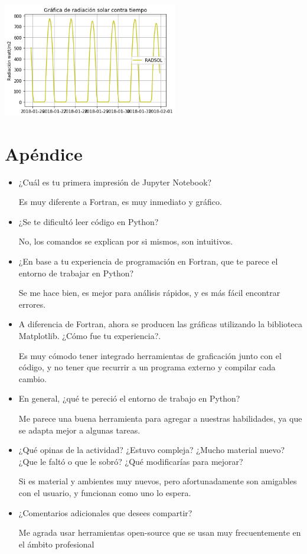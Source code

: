 \documentclass[a4paper]{article}
\begin{document}
\begin{center}
\includegraphics[height=5cm]{grafica6.png}

\end{center}


\section*{Apéndice}


\begin{itemize}
\item     ¿Cuál es tu primera impresión de Jupyter Notebook?

Es muy diferente a Fortran, es muy inmediato y gráfico.

\item     ¿Se te dificultó leer código en Python?

No, los comandos se explican por si mismos, son intuitivos.

\item     ¿En base a tu experiencia de programación en Fortran, que te parece el entorno de trabajar en Python?

Se me hace bien, es mejor para análisis rápidos, y es más fácil encontrar errores.

\item     A diferencia de Fortran, ahora se producen las gráficas utilizando la biblioteca Matplotlib. ¿Cómo fue tu experiencia?. 

Es muy cómodo tener integrado herramientas de graficación junto con el código, y no tener que recurrir a un programa externo y compilar cada cambio.

\item     En general, ¿qué te pereció el entorno de trabajo en Python? 

Me parece una buena herramienta para agregar a nuestras habilidades, ya que se adapta mejor a algunas tareas.

\item     ¿Qué opinas de la actividad? ¿Estuvo compleja? ¿Mucho material nuevo? ¿Que le faltó o que le sobró? ¿Qué modificarías para mejorar? 

Si es material y ambientes muy nuevos, pero afortunadamente son amigables con el usuario, y funcionan como uno lo espera.

\item     ¿Comentarios adicionales que desees compartir? 

Me agrada usar herramientas open-source que se usan muy frecuentemente en el ámbito profesional

\end{itemize}
\end{document}
